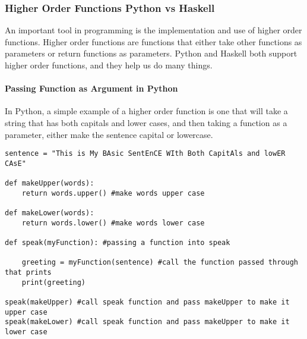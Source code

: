 \documentclass{article}
\begin{document}
\subsubsection{Higher Order Functions Python vs Haskell}
An important tool in programming is the implementation and use of higher order functions. Higher order functions are functions that either take other functions as parameters or return functions as parameters. Python and Haskell both support higher order functions, and they help us do many things.
\\
\paragraph{Passing Function as Argument in Python}
In Python, a simple example of a higher order function is one that will take a string that has both capitals and lower cases, and then taking a function as a parameter, either make the sentence capital or lowercase.


\begin{lstlisting}
sentence = "This is My BAsic SentEnCE WIth Both CapitAls and lowER CAsE"

def makeUpper(words):
    return words.upper() #make words upper case

def makeLower(words):
    return words.lower() #make words lower case

def speak(myFunction): #passing a function into speak

    greeting = myFunction(sentence) #call the function passed through that prints
    print(greeting)

speak(makeUpper) #call speak function and pass makeUpper to make it upper case
speak(makeLower) #call speak function and pass makeUpper to make it lower case
\end{lstlisting}
\end{document}
